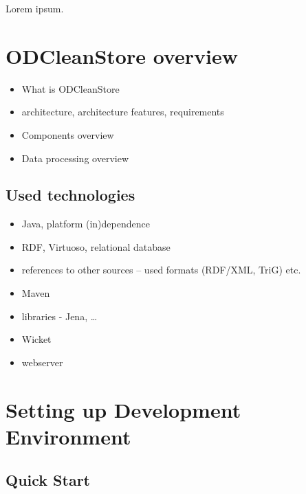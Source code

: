
\newcommand{\version}{0.3.1}
\newcommand{\documentname}{\refprogrammersguide}






\renewcommand{\contentsname}{Contents}
\tableofcontents
\bigskip

\newpage


Lorem ipsum.


\chapter{ODCleanStore overview} 

\begin{itemize}
	\item What is ODCleanStore
	\item architecture, architecture features, requirements
	\item Components overview
	\item Data processing overview
\end{itemize}

\section{Used technologies}

\begin{itemize}
	\item Java, platform (in)dependence
	\item RDF, Virtuoso, relational database
	\item references to other sources -- used formats (RDF/XML, TriG) etc.
	\item Maven
	\item libraries - Jena, \ldots
	\item Wicket
	\item webserver
\end{itemize}

\chapter{Setting up Development Environment}

\section{Quick Start}
